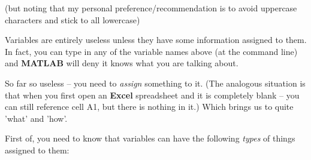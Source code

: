 \documentclass{tufte-book} %
\begin{document}
\noindent (but noting that my personal preference/recommendation is to avoid uppercase characters and stick to all lowercase)

Variables are entirely useless unless they have some information assigned to them. In fact, you can type in any of the variable names above (at the command line) and \textbf{MATLAB} will deny it knows what you are talking about.

So far so useless -- you need to \textit{assign} something to it. (The analogous situation is that when you first open an \textbf{Excel} spreadsheet and it is completely blank -- you can still reference cell A1, but there is nothing in it.) Which brings us to quite 'what' and 'how'.

First of, you need to know that variables can have the following \textit{types} of things assigned to them:
\end{document}
